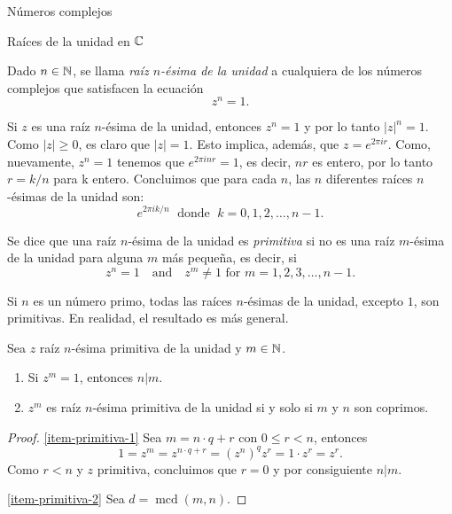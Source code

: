 \begin{chapter}{N\'umeros complejos}
    \begin{section}{Raíces de la unidad en $\mathbb C$}

        \begin{definicion}
            Dado $n \in \mathbb N$, se llama \textit{raíz $n$-ésima de la unidad} a cualquiera de los números complejos que satisfacen la ecuación 
            $$
            z^n = 1.
            $$ 
        \end{definicion}

        Si $z$  es una raíz $n$-ésima de la unidad,  entonces $z^n=1$ y por lo tanto $|z|^n = 1$. Como $|z|\ge 0$,  es claro que  $|z|=1$. Esto implica, además,  que $z =  e^{2 \pi i r}$. Como, nuevamente,   $z^n=1$ tenemos que $ e^{2 \pi i nr}=1$,  es decir,  $nr$ es entero, por lo tanto $r = k/n$ para k  entero. Concluimos que para cada $n$, las $n$ diferentes raíces $n$-ésimas de la unidad son:
        $$
        e^{2 \pi i k/n} \;\text{ donde }\;  k = 0, 1, 2, \ldots, n-1.
        $$

        Se dice que una raíz $n$-ésima de la unidad es \textit{primitiva} si no es una raíz $m$-ésima de la unidad para alguna $m$ más pequeña, es decir, si
        $$
        z^{n}=1\quad \text{and}\quad z^{m}\neq 1\text{ for } m=1,2,3,\ldots ,n-1.
        $$

        Si $n$ es un número primo, todas las raíces $n$-ésimas de la unidad, excepto $1$, son primitivas. En  realidad,  el resultado es más general.

        \begin{proposicion}
            Sea $z$ raíz $n$-ésima primitiva de la unidad y $m \in \mathbb N$.
            \begin{enumerate}
                \item\label{item-primitiva-1} Si $z^m=1$,  entonces $n|m$.
                \item\label{item-primitiva-2} $z^m$  es raíz $n$-ésima primitiva de la unidad si y solo si $m$ y $n$  son coprimos.
            \end{enumerate}
            
        \end{proposicion}
        \begin{proof}
            \ref{item-primitiva-1} Sea $m = n\cdot q + r$ con $0 \le r < n$, entonces $$1 = z^m = z^{n\cdot q + r} = (z^{n})^qz^r = 1 \cdot z^r = z^r.$$ Como $r<n$ y $z$ primitiva, concluimos que $r=0$ y por consiguiente $n|m$.

            \ref{item-primitiva-2} Sea $d = \operatorname{mcd}(m, n)$. 
            

\end{proof}
\end{section}
\end{chapter}
